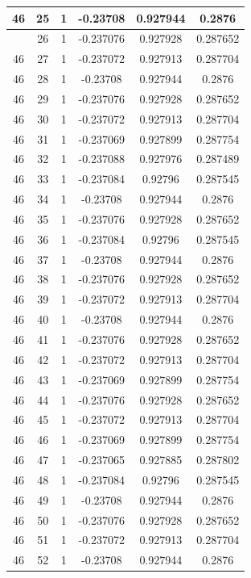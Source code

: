 \documentclass[12pt,a4paper]{article}
\numberwithin{equation}{section}
\numberwithin{figure}{section}
\numberwithin{table}{section}
\begin{document}
\begin{longtable}{|c|c|c|c|c|c|}
46 & 25 & 1 & -0.23708 & 0.927944 & 0.2876 \\ \hline
\pagebreak
46 & 26 & 1 & -0.237076 & 0.927928 & 0.287652 \\ \hline
46 & 27 & 1 & -0.237072 & 0.927913 & 0.287704 \\ \hline
46 & 28 & 1 & -0.23708 & 0.927944 & 0.2876 \\ \hline
46 & 29 & 1 & -0.237076 & 0.927928 & 0.287652 \\ \hline
46 & 30 & 1 & -0.237072 & 0.927913 & 0.287704 \\ \hline
46 & 31 & 1 & -0.237069 & 0.927899 & 0.287754 \\ \hline
46 & 32 & 1 & -0.237088 & 0.927976 & 0.287489 \\ \hline
46 & 33 & 1 & -0.237084 & 0.92796 & 0.287545 \\ \hline
46 & 34 & 1 & -0.23708 & 0.927944 & 0.2876 \\ \hline
46 & 35 & 1 & -0.237076 & 0.927928 & 0.287652 \\ \hline
46 & 36 & 1 & -0.237084 & 0.92796 & 0.287545 \\ \hline
46 & 37 & 1 & -0.23708 & 0.927944 & 0.2876 \\ \hline
46 & 38 & 1 & -0.237076 & 0.927928 & 0.287652 \\ \hline
46 & 39 & 1 & -0.237072 & 0.927913 & 0.287704 \\ \hline
46 & 40 & 1 & -0.23708 & 0.927944 & 0.2876 \\ \hline
46 & 41 & 1 & -0.237076 & 0.927928 & 0.287652 \\ \hline
46 & 42 & 1 & -0.237072 & 0.927913 & 0.287704 \\ \hline
46 & 43 & 1 & -0.237069 & 0.927899 & 0.287754 \\ \hline
46 & 44 & 1 & -0.237076 & 0.927928 & 0.287652 \\ \hline
46 & 45 & 1 & -0.237072 & 0.927913 & 0.287704 \\ \hline
46 & 46 & 1 & -0.237069 & 0.927899 & 0.287754 \\ \hline
46 & 47 & 1 & -0.237065 & 0.927885 & 0.287802 \\ \hline
46 & 48 & 1 & -0.237084 & 0.92796 & 0.287545 \\ \hline
46 & 49 & 1 & -0.23708 & 0.927944 & 0.2876 \\ \hline
46 & 50 & 1 & -0.237076 & 0.927928 & 0.287652 \\ \hline
46 & 51 & 1 & -0.237072 & 0.927913 & 0.287704 \\ \hline
46 & 52 & 1 & -0.23708 & 0.927944 & 0.2876 \\ \hline

\end{longtable}
\end{document}
